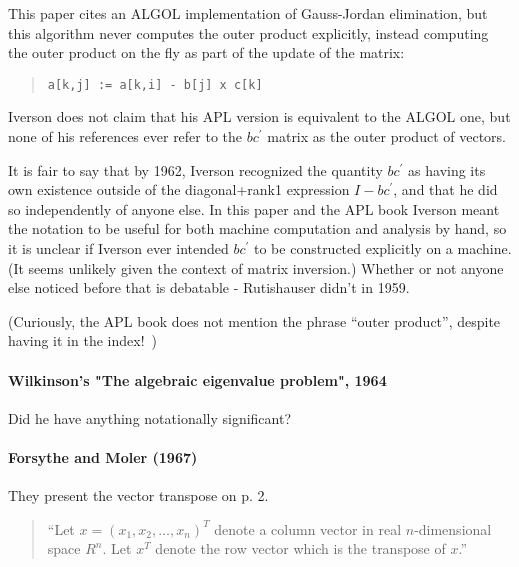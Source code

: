 This paper cites an ALGOL implementation of Gauss-Jordan elimination, but this algorithm never computes the outer product explicitly, instead computing the outer product on the fly as part of the update of the matrix:~\cite{Cohen1961}

\begin{quote}
\begin{verbatim}
a[k,j] := a[k,i] - b[j] x c[k]
\end{verbatim}
\end{quote}

Iverson does not claim that his APL version is equivalent to the ALGOL one, but none of his references ever refer to the $b c^\prime$ matrix as the outer product of vectors.

It is fair to say that by 1962, Iverson recognized the quantity $b c^\prime$ as having its own existence outside of the diagonal+rank1 expression $I - b c^\prime$, and that he did so independently of anyone else. In this paper and the APL book Iverson meant the notation to be useful for both machine computation and analysis by hand, so it is unclear if Iverson ever intended $b c^\prime$ to be constructed explicitly on a machine. (It seems unlikely given the context of matrix inversion.) Whether or not anyone else noticed before that is debatable - Rutishauser didn't in 1959.

(Curiously, the APL book does not mention the phrase ``outer product'', despite having it in the index!~\cite{Iverson1962book})


\paragraph{Wilkinson's "The algebraic eigenvalue problem", 1964}

Did he have anything notationally significant?



\paragraph{Forsythe and Moler (1967)~\cite{Forsythe1967}}

They present the vector transpose on p. 2.
\begin{quote}
``Let $x = (x_1, x_2, \dots, x_n)^T$ denote a column vector in real $n$-dimensional space $R^n$. Let $x^T$ denote the row vector which is the transpose of $x$.''~\cite[p. 2]{Forsythe1967}
\end{quote}

